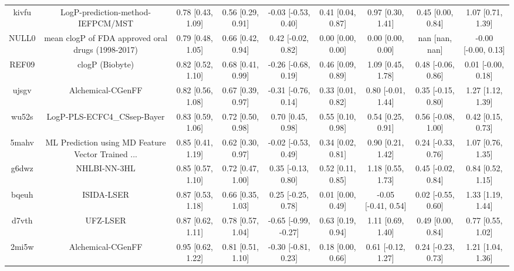 \documentclass{article}
\begin{document}
\begin{center}
\begin{longtable}{|ccccccccc|}
 kivfu &                  LogP-prediction-method-IEFPCM/MST &  0.78 [0.43, 1.09] &  0.56 [0.29, 0.91] &   -0.03 [-0.53, 0.40] &  0.41 [0.04, 0.87] &    0.97 [0.30, 1.41] &    0.45 [0.00, 0.84] &     1.07 [0.71, 1.39] \\
 NULL0 &  mean clogP of FDA approved oral drugs (1998-2017) &  0.79 [0.48, 1.05] &  0.66 [0.42, 0.94] &    0.42 [-0.02, 0.82] &  0.00 [0.00, 0.00] &    0.00 [0.00, 0.00] &       nan [nan, nan] &   -0.00 [-0.00, 0.13] \\
 REF09 &                                    clogP (Biobyte) &  0.82 [0.52, 1.10] &  0.68 [0.41, 0.99] &   -0.26 [-0.68, 0.19] &  0.46 [0.09, 0.89] &    1.09 [0.45, 1.78] &   0.48 [-0.06, 0.86] &    0.01 [-0.00, 0.18] \\
 ujsgv &                                  Alchemical-CGenFF &  0.82 [0.56, 1.08] &  0.67 [0.39, 0.97] &   -0.31 [-0.76, 0.14] &  0.33 [0.01, 0.82] &   0.80 [-0.01, 1.44] &   0.35 [-0.15, 0.80] &     1.27 [1.12, 1.39] \\
 wu52s &                        LogP-PLS-ECFC4\_CSsep-Bayer &  0.83 [0.59, 1.06] &  0.72 [0.50, 0.98] &     0.70 [0.45, 0.98] &  0.55 [0.10, 0.98] &    0.54 [0.25, 0.91] &   0.56 [-0.08, 1.00] &     0.42 [0.15, 0.73] \\
 5mahv &  ML Prediction using MD Feature Vector Trained ... &  0.85 [0.41, 1.19] &  0.62 [0.30, 0.97] &   -0.02 [-0.53, 0.49] &  0.34 [0.02, 0.81] &    0.90 [0.21, 1.42] &   0.24 [-0.33, 0.76] &     1.07 [0.76, 1.35] \\
 g6dwz &                                       NHLBI-NN-3HL &  0.85 [0.57, 1.10] &  0.72 [0.47, 1.00] &    0.35 [-0.13, 0.80] &  0.52 [0.11, 0.85] &    1.18 [0.55, 1.73] &   0.45 [-0.02, 0.84] &     0.84 [0.52, 1.15] \\
 bqeuh &                                         ISIDA-LSER &  0.87 [0.53, 1.18] &  0.66 [0.35, 1.03] &    0.25 [-0.25, 0.78] &  0.01 [0.00, 0.49] &  -0.05 [-0.41, 0.54] &   0.02 [-0.55, 0.60] &     1.33 [1.19, 1.44] \\
 d7vth &                                           UFZ-LSER &  0.87 [0.62, 1.11] &  0.78 [0.57, 1.04] &  -0.65 [-0.99, -0.27] &  0.63 [0.19, 0.94] &    1.11 [0.69, 1.40] &    0.49 [0.00, 0.84] &     0.77 [0.55, 1.02] \\
 2mi5w &                                  Alchemical-CGenFF &  0.95 [0.62, 1.22] &  0.81 [0.51, 1.10] &   -0.30 [-0.81, 0.23] &  0.18 [0.00, 0.66] &   0.61 [-0.12, 1.27] &   0.24 [-0.23, 0.73] &     1.21 [1.04, 1.36] \\

\end{longtable}
\end{center}
\end{document}
